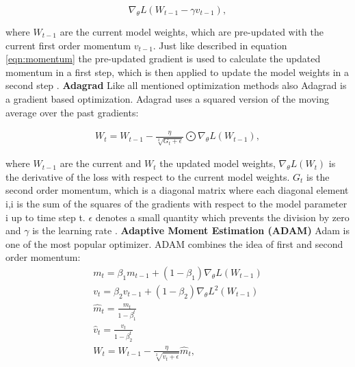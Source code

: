 \begin{equation}
    \nabla_{\theta}L( W_{t-1} - \gamma v_{t-1}),
\end{equation}

where $W_{t-1}$ are the current model weights, which are pre-updated with the current first order momentum $v_{t-1}$. Just like described in equation \ref{eqn:momentum} the pre-updated gradient is used to calculate the updated momentum in a first step, which is then applied to update the model weights in a second step \cite{Ruder2016}.
\newline
\newline
\textbf{Adagrad}
\newline
Like all mentioned optimization methods also Adagrad is a gradient based optimization. Adagrad uses a squared version of the moving average over the past gradients:

\begin{equation}
  \begin{aligned}
  W_{t} = W_{t-1} - \frac{\eta}{\sqrt[2]{G_{t}+ \epsilon}} \bigodot \nabla_{\theta}L(W_{t-1}),
  \end{aligned}
  \label{eq:Adagrad}
\end{equation}

where  $W_{t-1}$ are the current and $W_{t}$ the updated model weights, $\nabla_{\theta}L(W_{t})$ is the derivative of the loss with respect to the current model weights. $G_{t}$ is the second order momentum, which is a diagonal matrix where each diagonal element i,i is the sum of the squares of the gradients with respect to the model parameter i up to time step t. $\epsilon$ denotes a small quantity which prevents the division by zero and $\gamma$ is the learning rate \cite{Ruder2016}.
\newline
\newline
\textbf{Adaptive Moment Estimation (ADAM)}
\newline
Adam is one of the most popular optimizer. ADAM combines the idea of first and second order momentum: 
\begin{equation}
  \begin{aligned}
   &m_{t} =  \beta_{1} m_{t-1} +  (1-\beta_{1}) \nabla_{\theta}L(W_{t-1}) &\\
    &v_{t} =  \beta_{2} v_{t-1} +  (1-\beta_{2}) \nabla_{\theta}L^{2}(W_{t-1}) &\\
    &\hat{m}_{t} = \frac{m_{t}}{1-\beta_{1}^{t}}&\\
    &\hat{v}_{t} = \frac{v_{t}}{1-\beta_{2}^{t}}&\\
   & W_{t} = W_{t-1} - \frac{\eta}{\sqrt[2]{\hat{v}_{t} + \epsilon}}\hat{m}_{t}, &\\
  \end{aligned}
  \label{eq:ADAM}
\end{equation}

